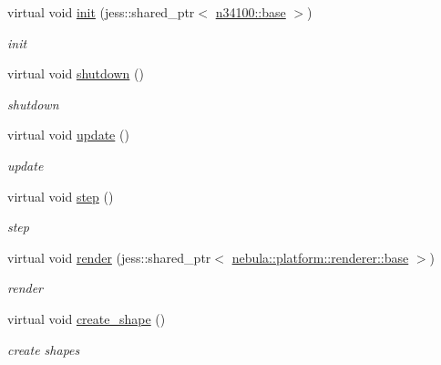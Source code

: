 \begin{DoxyCompactItemize}
\item 
virtual void \hyperlink{classnebula_1_1content_1_1actor_1_1physics_1_1physx_1_1rigid__dynamic__box_a6e2234156648244b1b49d3028f0855e2}{init} (jess::shared\_\-ptr$<$ \hyperlink{classnebula_1_1content_1_1actor_1_1admin_1_1base}{n34100::base} $>$)
\begin{DoxyCompactList}\small\item\em init \item\end{DoxyCompactList}\item 
virtual void \hyperlink{classnebula_1_1content_1_1actor_1_1physics_1_1physx_1_1rigid__dynamic__box_ae9b1ab77b71317d75e61ff1d1b14e4a1}{shutdown} ()
\begin{DoxyCompactList}\small\item\em shutdown \item\end{DoxyCompactList}\item 
virtual void \hyperlink{classnebula_1_1content_1_1actor_1_1physics_1_1physx_1_1rigid__dynamic__box_af0b2a118a005904df613fa771c55da93}{update} ()
\begin{DoxyCompactList}\small\item\em update \item\end{DoxyCompactList}\item 
virtual void \hyperlink{classnebula_1_1content_1_1actor_1_1physics_1_1physx_1_1rigid__dynamic__box_a4ac8017f98a1169db046acd4ab178117}{step} ()
\begin{DoxyCompactList}\small\item\em step \item\end{DoxyCompactList}\item 
virtual void \hyperlink{classnebula_1_1content_1_1actor_1_1physics_1_1physx_1_1rigid__dynamic__box_ad00353b6787484bdd2619f7294b82afb}{render} (jess::shared\_\-ptr$<$ \hyperlink{classnebula_1_1platform_1_1renderer_1_1base}{nebula::platform::renderer::base} $>$)
\begin{DoxyCompactList}\small\item\em render \item\end{DoxyCompactList}\item 
virtual void \hyperlink{classnebula_1_1content_1_1actor_1_1physics_1_1physx_1_1rigid__dynamic__box_a2f7f5578f4651247e1440338b372438b}{create\_\-shape} ()
\begin{DoxyCompactList}\small\item\em create shapes \item\end{DoxyCompactList}\end{DoxyCompactItemize}
